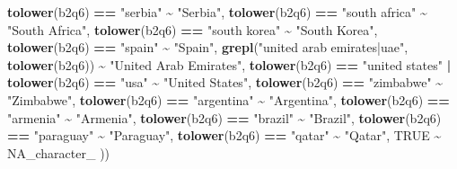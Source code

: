 \documentclass[
]{article}
\newenvironment{Shaded}{\begin{snugshade}}{\end{snugshade}}
\newcommand{\ConstantTok}[1]{\textcolor[rgb]{0.56,0.35,0.01}{#1}}
\newcommand{\FunctionTok}[1]{\textcolor[rgb]{0.13,0.29,0.53}{\textbf{#1}}}
\newcommand{\NormalTok}[1]{#1}
\newcommand{\SpecialCharTok}[1]{\textcolor[rgb]{0.81,0.36,0.00}{\textbf{#1}}}
\newcommand{\StringTok}[1]{\textcolor[rgb]{0.31,0.60,0.02}{#1}}
\begin{document}
\begin{Shaded}
\begin{Highlighting}[]
    \FunctionTok{tolower}\NormalTok{(b2q6) }\SpecialCharTok{==} \StringTok{"serbia"}                         \SpecialCharTok{\textasciitilde{}} \StringTok{"Serbia"}\NormalTok{,}
    \FunctionTok{tolower}\NormalTok{(b2q6) }\SpecialCharTok{==} \StringTok{"south africa"}                   \SpecialCharTok{\textasciitilde{}} \StringTok{"South Africa"}\NormalTok{,}
    \FunctionTok{tolower}\NormalTok{(b2q6) }\SpecialCharTok{==} \StringTok{"south korea"}                    \SpecialCharTok{\textasciitilde{}} \StringTok{"South Korea"}\NormalTok{,}
    \FunctionTok{tolower}\NormalTok{(b2q6) }\SpecialCharTok{==} \StringTok{"spain"}                          \SpecialCharTok{\textasciitilde{}} \StringTok{"Spain"}\NormalTok{,}
    \FunctionTok{grepl}\NormalTok{(}\StringTok{"united arab emirates|uae"}\NormalTok{, }\FunctionTok{tolower}\NormalTok{(b2q6)) }\SpecialCharTok{\textasciitilde{}} \StringTok{"United Arab Emirates"}\NormalTok{,}
    \FunctionTok{tolower}\NormalTok{(b2q6) }\SpecialCharTok{==} \StringTok{"united states"} \SpecialCharTok{|} \FunctionTok{tolower}\NormalTok{(b2q6) }\SpecialCharTok{==} \StringTok{"usa"} \SpecialCharTok{\textasciitilde{}} \StringTok{"United States"}\NormalTok{,}
    \FunctionTok{tolower}\NormalTok{(b2q6) }\SpecialCharTok{==} \StringTok{"zimbabwe"}                       \SpecialCharTok{\textasciitilde{}} \StringTok{"Zimbabwe"}\NormalTok{,}
    \FunctionTok{tolower}\NormalTok{(b2q6) }\SpecialCharTok{==} \StringTok{"argentina"}                      \SpecialCharTok{\textasciitilde{}} \StringTok{"Argentina"}\NormalTok{,}
    \FunctionTok{tolower}\NormalTok{(b2q6) }\SpecialCharTok{==} \StringTok{"armenia"}                        \SpecialCharTok{\textasciitilde{}} \StringTok{"Armenia"}\NormalTok{,}
    \FunctionTok{tolower}\NormalTok{(b2q6) }\SpecialCharTok{==} \StringTok{"brazil"}                         \SpecialCharTok{\textasciitilde{}} \StringTok{"Brazil"}\NormalTok{,}
    \FunctionTok{tolower}\NormalTok{(b2q6) }\SpecialCharTok{==} \StringTok{"paraguay"}                       \SpecialCharTok{\textasciitilde{}} \StringTok{"Paraguay"}\NormalTok{,}
    \FunctionTok{tolower}\NormalTok{(b2q6) }\SpecialCharTok{==} \StringTok{"qatar"}                          \SpecialCharTok{\textasciitilde{}} \StringTok{"Qatar"}\NormalTok{,}
    \ConstantTok{TRUE} \SpecialCharTok{\textasciitilde{}} \ConstantTok{NA\_character\_}
\NormalTok{  ))}


\end{Highlighting}
\end{Shaded}
\end{document}
